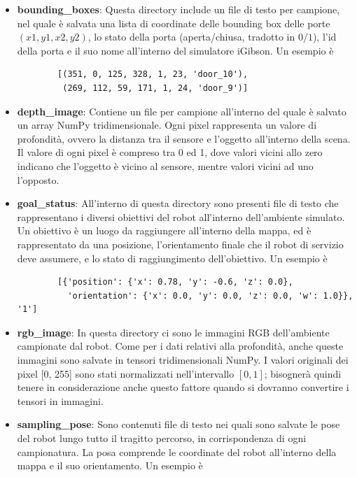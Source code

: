 \documentclass[12pt]{report}
\begin{document}
\begin{itemize}
	\item \textbf{bounding\_boxes}: Questa directory include un file di testo per campione, nel quale è salvata una lista di coordinate delle bounding box delle porte $(x1, y1, x2, y2)$, lo stato della porta (aperta/chiusa, tradotto in $0/1$), l'id della porta e il suo nome all'interno del simulatore iGibson. Un esempio è
	
	\begin{verbatim}
		[(351, 0, 125, 328, 1, 23, 'door_10'),
		 (269, 112, 59, 171, 1, 24, 'door_9')]
	\end{verbatim}
	
	\item \textbf{depth\_image}: Contiene un file per campione all'interno del quale è salvato un array NumPy tridimensionale. Ogni pixel rappresenta un valore di profondità, ovvero la distanza tra il sensore e l'oggetto all'interno della scena. Il valore di ogni pixel è compreso tra 0 ed 1, dove valori vicini allo zero indicano che l'oggetto è vicino al sensore, mentre valori vicini ad uno l'opposto.
	
	\item \textbf{goal\_status}: All'interno di questa directory sono presenti file di testo che rappresentano i diversi obiettivi del robot all'interno dell'ambiente simulato. Un obiettivo è un luogo da raggiungere all'interno della mappa, ed è rappresentato da una posizione, l'orientamento finale che il robot di servizio deve assumere, e lo stato di raggiungimento dell'obiettivo. Un esempio è
	
	\begin{verbatim}
		[{'position': {'x': 0.78, 'y': -0.6, 'z': 0.0},
		  'orientation': {'x': 0.0, 'y': 0.0, 'z': 0.0, 'w': 1.0}}, '1']
	\end{verbatim}
	
	\item \textbf{rgb\_image}: In questa directory ci sono le immagini RGB dell'ambiente campionate dal robot. Come per i dati relativi alla profondità, anche queste immagini sono salvate in tensori tridimensionali NumPy. I valori originali dei pixel [0, 255] sono stati normalizzati nell'intervallo $[0, 1]$; bisognerà quindi tenere in considerazione anche questo fattore quando si dovranno convertire i tensori in immagini.
	
	\item \textbf{sampling\_pose}: Sono contenuti file di testo nei quali sono salvate le pose del robot lungo tutto il tragitto percorso, in corrispondenza di ogni campionatura. La posa comprende le coordinate del robot all'interno della mappa e il suo orientamento. Un esempio è
	

\end{itemize}
\end{document}
